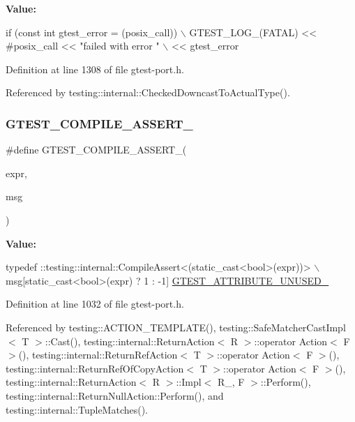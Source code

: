 {\bfseries Value\+:}
\begin{DoxyCode}
\textcolor{keywordflow}{if} (\textcolor{keyword}{const} \textcolor{keywordtype}{int} gtest\_error = (posix\_call)) \(\backslash\)
    GTEST\_LOG\_(FATAL) << #posix\_call << \textcolor{stringliteral}{"failed with error "} \(\backslash\)
                      << gtest\_error
\end{DoxyCode}


Definition at line 1308 of file gtest-\/port.\+h.



Referenced by testing\+::internal\+::\+Checked\+Downcast\+To\+Actual\+Type().

\mbox{\label{gtest-port_8h_ae1f37dc71d5daa6fb49ca1b6047d4a8c}} 
\subsubsection{\texorpdfstring{G\+T\+E\+S\+T\+\_\+\+C\+O\+M\+P\+I\+L\+E\+\_\+\+A\+S\+S\+E\+R\+T\+\_\+}{GTEST\_COMPILE\_ASSERT\_}}
{\footnotesize\ttfamily \#define G\+T\+E\+S\+T\+\_\+\+C\+O\+M\+P\+I\+L\+E\+\_\+\+A\+S\+S\+E\+R\+T\+\_\+(\begin{DoxyParamCaption}\item[{}]{expr,  }\item[{}]{msg }\end{DoxyParamCaption})}

{\bfseries Value\+:}
\begin{DoxyCode}
typedef ::testing::internal::CompileAssert<(static\_cast<bool>(expr))> \(\backslash\)
      msg[\textcolor{keyword}{static\_cast<}\textcolor{keywordtype}{bool}\textcolor{keyword}{>}(expr) ? 1 : -1] \hyperlink{gtest-port_8h_acdd47601a9376161c349a5881ccc6918}{GTEST\_ATTRIBUTE\_UNUSED\_}
\end{DoxyCode}


Definition at line 1032 of file gtest-\/port.\+h.



Referenced by testing\+::\+A\+C\+T\+I\+O\+N\+\_\+\+T\+E\+M\+P\+L\+A\+T\+E(), testing\+::\+Safe\+Matcher\+Cast\+Impl$<$ T $>$\+::\+Cast(), testing\+::internal\+::\+Return\+Action$<$ R $>$\+::operator Action$<$ F $>$(), testing\+::internal\+::\+Return\+Ref\+Action$<$ T $>$\+::operator Action$<$ F $>$(), testing\+::internal\+::\+Return\+Ref\+Of\+Copy\+Action$<$ T $>$\+::operator Action$<$ F $>$(), testing\+::internal\+::\+Return\+Action$<$ R $>$\+::\+Impl$<$ R\+\_\+, F $>$\+::\+Perform(), testing\+::internal\+::\+Return\+Null\+Action\+::\+Perform(), and testing\+::internal\+::\+Tuple\+Matches().

